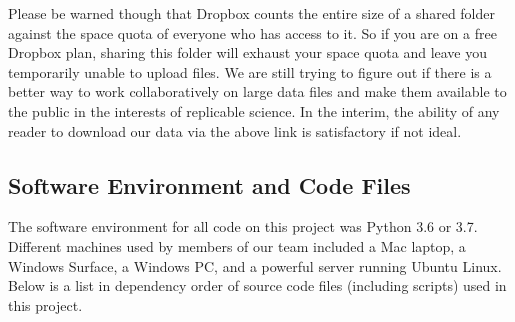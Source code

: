 \documentclass{article}
\begin{document}
Please be warned though that Dropbox counts the entire size of a shared folder against the
space quota of everyone who has access to it.  So if you are on a free Dropbox plan, 
sharing this folder will exhaust your space quota and leave you temporarily unable to upload files.
We are still trying to figure out if there is a better way to work collaboratively on large data files
and make them available to the public in the interests of replicable science.
In the interim, the ability of any reader to download our data via the above link is satisfactory if not ideal.

\newpage
\subsection{Software Environment and Code Files}
The software environment for all code on this project was Python 3.6 or 3.7.
Different machines used by members of our team included a Mac laptop, a Windows Surface, 
a Windows PC, and a powerful server running Ubuntu Linux.  
Below is a list in dependency order of source code files (including scripts) used in this project.
\end{document}
